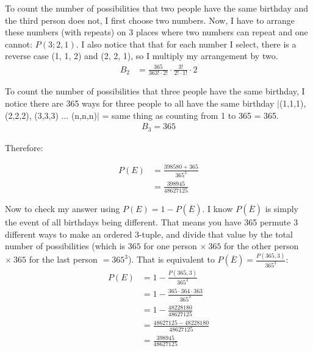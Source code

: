 \documentclass[11pt]{article}
\begin{document}
\begin{flushleft}
\begin{enumerate}
{\begin{enumerate}
{				      				      		      To count the number of possibilities that two people have the same birthday and the third person does not, I first choose two numbers. Now, I have to arrange these numbers (with repeats) on 3 places where two numbers can repeat and one cannot: $P(3; 2, 1)$. I also notice that that for each number I select, there is a reverse case (1, 1, 2) and (2, 2, 1), so I multiply my arrangement by two. 
				      				      		      \begin{align}
				      				      		      	B_2 & = \frac{365}{363!\cdot 2!} \cdot \frac{3!}{2!\cdot 1!} \cdot 2 \nonumber 
				      				      		      \end{align}
				      				      		      
				      				      		      To count the number of possibilities that three people have the same birthday, I notice there are 365 ways for three people to all have the same birthday $\mid$(1,1,1), (2,2,2), (3,3,3) ... (n,n,n)$\mid$ = same thing as counting from 1 to 365 = 365.
				      				      		      \begin{align}
				      				      		      	B_3 = 365 \nonumber 
				      				      		      \end{align}
				      				      		      
				      				      		      Therefore:
				      				      		      
				      				      		      \begin{align}
				      				      		      	P(E) & = \frac{398580 + 365}{365^3} \nonumber \\
				      				      		      	     & = \frac{398945}{48627125} \nonumber    
				      				      		      \end{align}
				      				      		      
				      				      		      Now to check my answer using $P(E) = 1 - P(\overline{E})$. I know $P(\overline{E})$ is simply the event of all birthdays being different. That means you have 365 permute 3 different ways to make an ordered 3-tuple, and divide that value by the total number of possibilities (which is $365$ for one person $ \times\ 365$ for the other person $ \times\ 365$ for the last person $ = 365^3$). That is equivalent to $P(\overline{E}) = \frac{P(365,3)}{365^3}$:
				      				      		      \begin{align*}
				      				      		      	P(E) & = 1 - \frac{P(365,3)}{365^3} \nonumber              \\
				      				      		      	     & = 1 - \frac{365\cdot 364\cdot 363}{365^3} \nonumber \\
				      				      		      	     & = 1 - \frac{48228180}{48627125} \nonumber           \\
				      				      		      	     & = \frac{48627125 - 48228180}{48627125}              \\
				      				      		      	     & = \frac{398945}{48627125}                           
				      				      		      \end{align*}
				      				      		      
}
\end{enumerate}}
\end{enumerate}
\end{flushleft}
\end{document}
